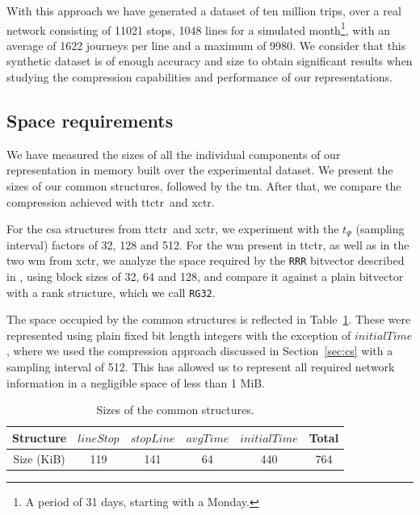    With this approach we have generated a dataset of ten million trips, over a real network consisting of 11021 stops, 1048 lines for a simulated month\footnote{A period of 31 days, starting with a Monday.}, with an average of 1622 journeys per line and a maximum of 9980. We consider that this synthetic dataset is of enough accuracy and size to obtain significant results when studying the compression capabilities and performance of our representations.
    
    \subsection{Space requirements}
    \label{sec:space}
    We have measured the sizes of all the individual components of our representation in memory built over the experimental dataset. We present the sizes of our common structures, followed by the \gls{tm}. After that, we compare the compression achieved with \gls{ttctr}~and \gls{xctr}.
    
    For the \gls{csa} structures from \gls{ttctr}~and \gls{xctr}, we experiment with the $t_\Psi$ (sampling interval) factors of 32, 128 and 512. For the \gls{wm} present in \gls{ttctr}, as well as in the two \gls{wm} from \gls{xctr}, we analyze the space required by the \texttt{RRR} bitvector described in \cite{Raman:2002:SID:545381.545411}, using block sizes of 32, 64 and 128, and compare it against a plain bitvector with a rank structure, which we call \texttt{RG32}.
    
    The space occupied by the common structures is reflected in Table~\ref{tab:commons}. These were represented using plain fixed bit length integers with the exception of $initialTime$, where we used the compression approach discussed in Section~\ref{sec:cs} with a sampling interval of 512. This has allowed us to represent all required network information in a negligible space of less than 1 MiB.
    
    \begin{table}
        \centering
        \caption{Sizes of the common structures.}
        \label{tab:commons}
        \begin{tabular}{|c|c|c|c|c|c|}
        \hline
            Structure & $lineStop$ & $stopLine$ & $avgTime$ & $initialTime$ & Total \\
            \hline
            Size (KiB) & 119 & 141 & 64 & 440 & 764 \\
        \hline
        \end{tabular}
    \end{table}
    

